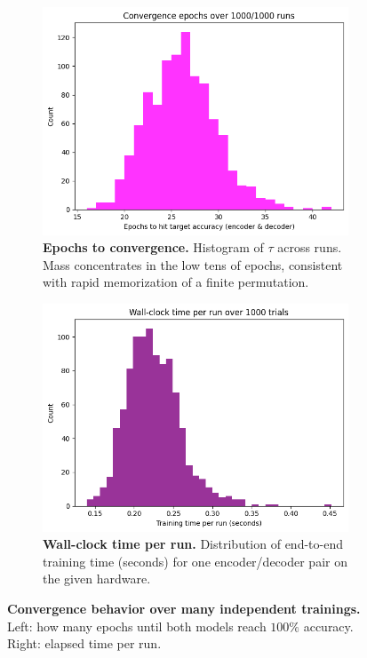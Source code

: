 \documentclass[12pt]{article}
\begin{document}
\begin{figure}[t]
    \centering
    \begin{subfigure}{0.49\textwidth}
        \centering
        \includegraphics[width=\linewidth]{convergence_epochs.png}
        \caption{\textbf{Epochs to convergence.} Histogram of $\tau$ across runs. Mass concentrates in the low tens of epochs, consistent with rapid memorization of a finite permutation.}
        \label{fig:epochs-conv}
    \end{subfigure}
    \hfill
    \begin{subfigure}{0.49\textwidth}
        \centering
        \includegraphics[width=\linewidth]{time-distribution.png}
        \caption{\textbf{Wall-clock time per run.} Distribution of end-to-end training time (seconds) for one encoder/decoder pair on the given hardware.}
        \label{fig:time-dist}
    \end{subfigure}
    \caption{\textbf{Convergence behavior over many independent trainings.} Left: how many epochs until both models reach $100\%$ accuracy. Right: elapsed time per run.}
    \label{fig:convergence-summary}
\end{figure}
\end{document}
